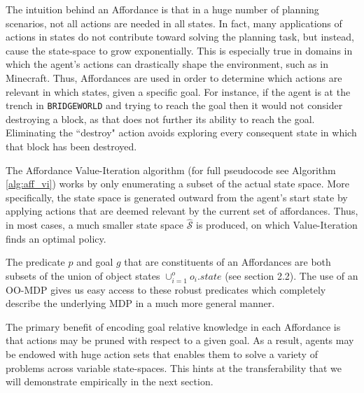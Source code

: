 \documentclass[]{article}
\begin{document}
The intuition behind an Affordance is that in a huge number of planning 
scenarios, not all actions are needed in all states. In fact, many applications 
of actions in states do not contribute toward solving the planning task, but 
instead, cause the state-space to grow exponentially. This is especially true 
in domains in which the agent's actions can drastically shape the environment, 
such as in Minecraft. Thus, Affordances are used in order to determine which 
actions are relevant in which states, given a specific goal. For instance, if the 
agent is at the trench in \texttt{BRIDGEWORLD} and trying to reach the goal then it
would not consider destroying a block, as that does not further its ability
to reach the goal. Eliminating the ``destroy" action avoids 
exploring every consequent state in which that block has been destroyed.

The Affordance Value-Iteration algorithm (for full pseudocode see Algorithm \ref{alg:aff_vi}) works by
only enumerating a subset of the actual state space. More specifically, the state space is generated
outward from the agent's start state by applying actions that are deemed relevant by the current
set of affordances. Thus, in most cases, a much smaller state space $\hat{\mathcal{S}}$ is produced,
on which Value-Iteration finds an optimal policy.

The predicate $p$ and goal $g$ that are constituents of an Affordances are both subsets of the union
of object states $\cup_{i = 1}^o o_i.state$ (see section 2.2).  The use of an OO-MDP gives us easy access to these
robust predicates which completely describe the underlying MDP in a much more general manner.

The primary benefit of encoding goal relative knowledge in each Affordance
is that actions may be pruned with respect to a given goal. As a result,
agents may be endowed with huge action sets that enables them to solve a variety of
problems across variable state-spaces. This
hints at the transferability that we will demonstrate empirically in the next section.
\end{document}
